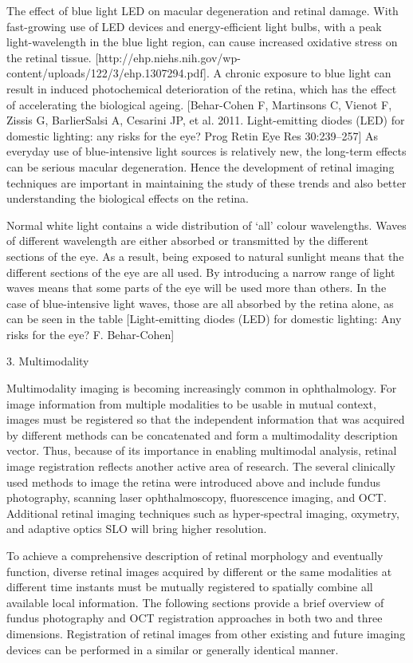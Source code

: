 The effect of blue light LED on macular degeneration and retinal damage. With fast-growing use of LED devices and energy-efficient light bulbs, with a peak light-wavelength in the blue light region, can cause increased oxidative stress on the retinal tissue. [http://ehp.niehs.nih.gov/wp-content/uploads/122/3/ehp.1307294.pdf]. A chronic exposure to blue light can result in induced photochemical deterioration of the retina, which has the effect of accelerating the biological ageing. [Behar-Cohen F, Martinsons C, Vienot F, Zissis G, BarlierSalsi A, Cesarini JP, et al. 2011. Light-emitting diodes (LED) for domestic lighting: any risks for the eye? Prog Retin Eye Res 30:239–257] As everyday use of blue-intensive light sources is relatively new, the long-term effects can be serious macular degeneration. Hence the development of retinal imaging techniques are important in maintaining the study of these trends and also better understanding the biological effects on the retina.
 
Normal white light contains a wide distribution of ‘all’ colour wavelengths. Waves of different wavelength are either absorbed or transmitted by the different sections of the eye. As a result, being exposed to natural sunlight means that the different sections of the eye are all used. By introducing a narrow range of light waves means that some parts of the eye will be used more than others. In the case of blue-intensive light waves, those are all absorbed by the retina alone, as can be seen in the table [Light-emitting diodes (LED) for domestic lighting: Any risks for the eye? F. Behar-Cohen]

3. Multimodality

Multimodality imaging is becoming increasingly common in ophthalmology. For image
information from multiple modalities to be usable in mutual context, images must be
registered so that the independent information that was acquired by different methods can be
concatenated and form a multimodality description vector. Thus, because of its importance
in enabling multimodal analysis, retinal image registration reflects another active area of
research. The several clinically used methods to image the retina were introduced above and
include fundus photography, scanning laser ophthalmoscopy, fluorescence imaging, and
OCT. Additional retinal imaging techniques such as hyper-spectral imaging, oxymetry, and
adaptive optics SLO will bring higher resolution.

To achieve a comprehensive description of retinal morphology and eventually function,
diverse retinal images acquired by different or the same modalities at different time instants
must be mutually registered to spatially combine all available local information. The
following sections provide a brief overview of fundus photography and OCT registration
approaches in both two and three dimensions. Registration of retinal images from other
existing and future imaging devices can be performed in a similar or generally identical
manner.
 

